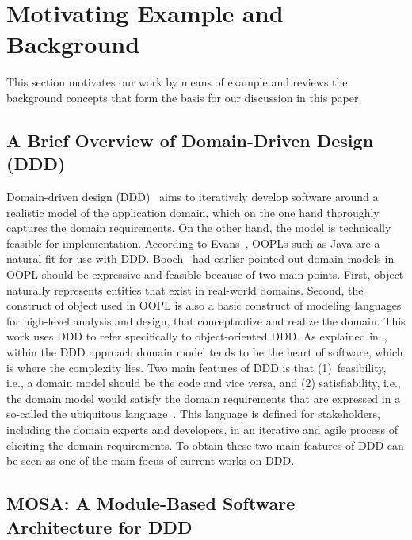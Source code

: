 \section{Motivating Example and Background} \label{sect:background}
This section motivates our work by means of example and reviews the background concepts that form the basis for our discussion in this paper.


\subsection{A Brief Overview of Domain-Driven Design (DDD)}
\label{sect:bg-arch} %

Domain-driven design (DDD)~\cite{evans_domain-driven_2004} aims to iteratively develop software around a realistic model of the application domain, which on the one hand thoroughly captures the domain requirements. On the other hand, the model is technically feasible for implementation. According to Evans~\cite{evans_domain-driven_2004}, OOPLs such as Java are a natural fit for use with DDD. Booch~\cite{booch_object-oriented_1986} had earlier pointed out domain models in OOPL should be expressive and feasible because of two main points. First, object naturally represents entities that exist in real-world domains. Second, the construct of object used in OOPL is also a basic construct of modeling languages for high-level analysis and design, that conceptualize and realize the domain. This work uses DDD to refer specifically to object-oriented DDD. As explained in~\cite{evans_domain-driven_2004}, within the DDD approach domain model tends to be the heart of software, which is where the complexity lies. Two main features of DDD is that (1)~feasibility, i.e., a domain model should be the code and vice versa, and (2) satisfiability, i.e., the domain model would satisfy the domain requirements that are expressed in a so-called the ubiquitous language~\cite{evans_domain-driven_2004}. This language is defined for stakeholders, including the domain experts and developers, in an iterative and agile process of eliciting the domain requirements. To obtain these two main features of DDD can be seen as one of the main focus of current works on DDD. 

\subsection{MOSA: A Module-Based Software Architecture for DDD}
\label{sect:bg-arch} %

